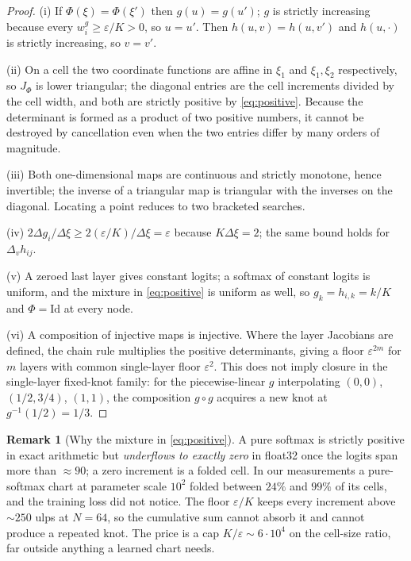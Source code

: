 \documentclass[11pt,a4paper]{article}
\theoremstyle{plain}
\theoremstyle{definition}
\newtheorem{remark}[theorem]{Remark}
\newcommand{\Id}{\mathrm{Id}}
\begin{document}
\begin{proof}
(i) If $\Phi(\xi)=\Phi(\xi')$ then $g(u)=g(u')$; $g$ is strictly increasing
because every $w^g_i\ge\varepsilon/K>0$, so $u=u'$.  Then $h(u,v)=h(u,v')$ and
$h(u,\cdot)$ is strictly increasing, so $v=v'$.

(ii) On a cell the two coordinate functions are affine in $\xi_1$ and
$\xi_1,\xi_2$ respectively, so $J_\Phi$ is lower triangular; the diagonal
entries are the cell increments divided by the cell width, and both are
strictly positive by \eqref{eq:positive}.  Because the determinant is formed as
a product of two positive numbers, it cannot be destroyed by cancellation even
when the two entries differ by many orders of magnitude.

(iii) Both one-dimensional maps are continuous and strictly monotone, hence
invertible; the inverse of a triangular map is triangular with the inverses on
the diagonal.  Locating a point reduces to two bracketed searches.

(iv) $2\Delta g_i/\Delta\xi \ge 2(\varepsilon/K)/\Delta\xi = \varepsilon$ because
$K\Delta\xi=2$; the same bound holds for $\Delta_v h_{ij}$.

(v) A zeroed last layer gives constant logits; a softmax of constant logits is
uniform, and the mixture in \eqref{eq:positive} is uniform as well, so
$g_k=h_{i,k}=k/K$ and $\Phi=\Id$ at every node.

(vi) A composition of injective maps is injective. Where the layer Jacobians
are defined, the chain rule multiplies the positive determinants, giving a floor
$\varepsilon^{2m}$ for $m$ layers with common single-layer floor $\varepsilon^2$.
This does not imply closure in the single-layer fixed-knot family: for the
piecewise-linear $g$ interpolating $(0,0)$, $(1/2,3/4)$, $(1,1)$, the composition
$g\circ g$ acquires a new knot at $g^{-1}(1/2)=1/3$.
\end{proof}

\begin{remark}[Why the mixture in \eqref{eq:positive}]
A pure softmax is strictly positive in exact arithmetic but \emph{underflows to
exactly zero} in float32 once the logits span more than $\approx 90$; a zero
increment is a folded cell.  In our measurements a pure-softmax chart at
parameter scale $10^{2}$ folded between $24\%$ and $99\%$ of its cells, and the
training loss did not notice.  The floor $\varepsilon/K$ keeps every increment
above $\sim250$ ulps at $N=64$, so the cumulative sum cannot absorb it and
cannot produce a repeated knot.  The price is a cap $K/\varepsilon\sim
6\cdot10^{4}$ on the cell-size ratio, far outside anything a learned chart
needs.
\end{remark}
\end{document}
